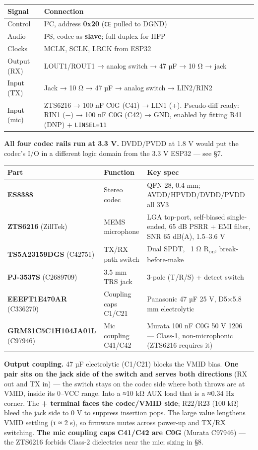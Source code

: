 \documentclass[11pt]{article}
\begin{document}
\begin{tabularx}{\linewidth}{@{}l X@{}}
\toprule
\textbf{Signal} & \textbf{Connection} \\
\midrule
Control & I²C, address \textbf{0x20} (\texttt{CE} pulled to DGND) \\
Audio & I²S, codec as \textbf{slave}; full duplex for HFP \\
Clocks & MCLK, SCLK, LRCK from ESP32 \\
Output (RX) & LOUT1/ROUT1 → analog switch → 47 µF → 10 Ω → jack \\
Input (TX) & Jack → 10 Ω → 47 µF → analog switch → LIN2/RIN2 \\
Input (mic) & ZTS6216 → 100 nF C0G (C41) → LIN1 (+). Pseudo-diff ready: RIN1 (−) → 100 nF C0G (C42) → GND, enabled by fitting R41 (DNP) + \texttt{LINSEL=11} \\
\bottomrule
\end{tabularx}

\textbf{All four codec rails run at 3.3 V.} DVDD/PVDD at 1.8 V would put the codec's I/O in a
different logic domain from the 3.3 V ESP32 — see §7.

\begin{tabularx}{\linewidth}{@{}l l X@{}}
\toprule
\textbf{Part} & \textbf{Function} & \textbf{Key spec} \\
\midrule
\textbf{ES8388} & Stereo codec & QFN-28, 0.4 mm; AVDD/HPVDD/DVDD/PVDD all 3V3 \\
\textbf{ZTS6216} (ZillTek) & MEMS microphone & LGA top-port, self-biased single-ended, 65 dB PSRR + EMI filter, SNR 65 dB(A), 1.5–3.6 V \\
\textbf{TS5A23159DGS} (C42751) & TX/RX path switch & Dual SPDT, ~1 Ω R\textsubscript{on}, break-before-make \\
\textbf{PJ-3537S} (C2689709) & 3.5 mm TRS jack & 3-pole (T/R/S) + detect switch \\
\textbf{EEEFT1E470AR} (C336270) & Coupling caps C1/C21 & Panasonic 47 µF 25 V, D5×5.8 mm electrolytic \\
\textbf{GRM31C5C1H104JA01L} (C97946) & Mic coupling C41/C42 & Murata 100 nF C0G 50 V 1206 — Class-1, non-microphonic (ZTS6216 requires it) \\
\bottomrule
\end{tabularx}

\textbf{Output coupling.} 47 µF electrolytic (C1/C21) blocks the VMID bias. \textbf{One pair sits on
the jack side of the switch and serves both directions} (RX out and TX in) — the switch stays on the
codec side where both throws are at VMID, inside its 0–VCC range. Into a ≈10 kΩ AUX load that is a
≈0.34 Hz corner. The \textbf{+ terminal faces the codec/VMID side}; R22/R23 (100 kΩ) bleed the jack
side to 0 V to suppress insertion pops. The large value lengthens VMID settling (τ ≈ 2 s), so
firmware mutes across power-up and TX/RX switching. \textbf{The mic coupling caps C41/C42 are C0G}
(Murata C97946) — the ZTS6216 forbids Class-2 dielectrics near the mic; sizing in §8.
\end{document}
